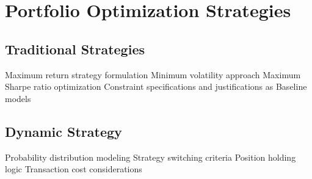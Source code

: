 \section{Portfolio Optimization Strategies}
\subsection{Traditional Strategies}
Maximum return strategy formulation
Minimum volatility approach
Maximum Sharpe ratio optimization
Constraint specifications and justifications as Baseline models
\subsection{Dynamic Strategy}
Probability distribution modeling
Strategy switching criteria
Position holding logic
Transaction cost considerations

